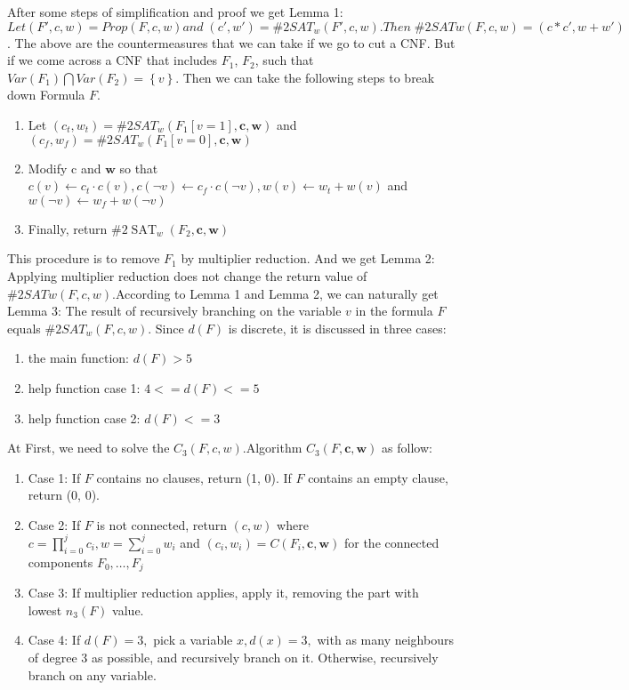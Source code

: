 \documentclass{sigchi}
\begin{document}
After some steps of simplification and proof we get Lemma 1: $Let({F}',c,w)=Prop(F,c,w) and\;({c}',{w}')=\#2SAT_{w}({F}',c,w). Then\; \#2SATw(F ,c,w)=(c*{c}',w+{w}')$. The above are the countermeasures that we can take if we go to cut a CNF. But if we come across a CNF that includes $F_{1}$, $F_{2}$, such that $Var(F_{1})\bigcap Var(F_2)=\left \{ v \right \} $. Then we can take the following steps to break down Formula $F$.
\begin{enumerate} 
	\item Let $\left(c_{t}, w_{t}\right)=\# 2 S A T_{w}\left(F_{1}[v=1], \mathbf{c}, \mathbf{w}\right)$ and $\left(c_{f}, w_{f}\right)=\# 2 S A T_{w}\left(F_{1}[v=0], \mathbf{c}, \mathbf{w}\right)$
	\item Modify c and $\mathbf{w}$ so that $c(v) \leftarrow c_{t} \cdot c(v), c(\neg v) \leftarrow c_{f} \cdot c(\neg v), w(v) \leftarrow w_{t}+w(v)$ and
	$w(\neg v) \leftarrow w_{f}+w(\neg v)$
	\item Finally, return $\# 2 \operatorname{SAT}_{w}\left(F_{2}, \mathbf{c}, \mathbf{w}\right)$
\end{enumerate}
This procedure is to remove $F_1$ by multiplier reduction. And we get Lemma 2: Applying multiplier reduction does not change the return value of $\#2SAT w (F, c, w)$.According to Lemma 1 and Lemma 2, we can naturally get Lemma 3: The result of recursively branching on the variable $v$ in the formula $F$ equals $\#2SAT_{w}(F, c, w)$. Since $d(F)$ is discrete, it is discussed in three cases:
\begin{enumerate}
	\item the main function: $d(F)>5$
	\item help function case 1: $4<=d(F)<=5$
	\item help function case 2: $d(F)<=3$
\end{enumerate}
At First, we need to solve the $C_{3}(F,c,w)$.Algorithm $C_{3}(F, \mathbf{c}, \mathbf{w})$ as follow:
\begin{enumerate}	
	\item Case 1: If $F$ contains no clauses, return (1, 0). If $F$ contains an empty clause, return (0, 0).
	\item Case 2: If $F$ is not connected, return $(c, w)$ where $c=\prod_{i=0}^{j} c_{i}, w=\sum_{i=0}^{j} w_{i}$ and $\left(c_{i}, w_{i}\right)=C\left(F_{i}, \mathbf{c}, \mathbf{w}\right)$ for the connected components $F_{0}, \ldots, F_{j}$
	\item Case 3: If multiplier reduction applies, apply it, removing the part with lowest $n_{3}(F)$ value.
	\item Case 4: If $d(F)=3,$ pick a variable $x, d(x)=3,$ with as many neighbours of degree 3 as possible, and recursively branch on it. Otherwise, recursively branch on any variable.$  $
\end{enumerate}
\end{document}
